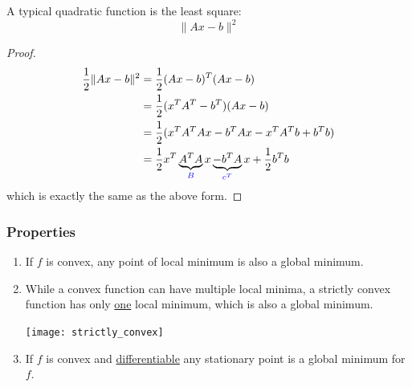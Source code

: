 \documentclass{article}
\begin{document}
A typical quadratic function is the least square:
$$\lVert Ax-b\rVert^2$$
\begin{proof}
    \begin{equation*}
        \begin{aligned}
            \frac{1}{2}\lVert Ax-b\rVert^2 &=\frac{1}{2}(Ax-b)^T(Ax-b)\\ 
                                &=\frac{1}{2}(x^TA^T-b^T)(Ax-b)\\
                                &=\frac{1}{2}(x^TA^TAx-b^TAx-x^TA^Tb+b^Tb)\\ 
                                &=\frac{1}{2}x^T\underbrace{A^TA}_{\color{blue}B}x\underbrace{-b^TA}_{\color{blue}c^T}x+\frac{1}{2}b^Tb
        \end{aligned}
    \end{equation*}
    which is exactly the same as the above form.
\end{proof}
\subsubsection{Properties}
\begin{enumerate}
    \item If $f$ is convex, any point of local minimum is also a global
        minimum. 
    \item While a convex function can have multiple local minima, a strictly
        convex function has only \underline{one} local minimum, which is also
        a global minimum.
        \begin{center}
            \texttt{[image: strictly\_convex]}
        \end{center}
    \item If $f$ is convex and \underline{differentiable} any stationary point
        is a global minimum for $f$.
\end{enumerate}
\end{document}
